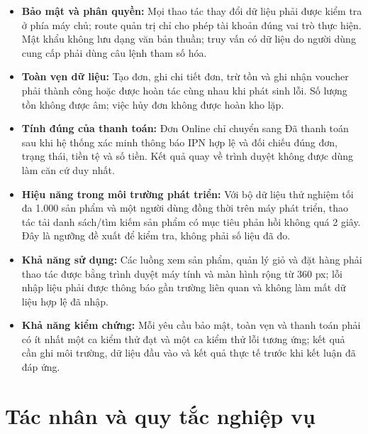 \begin{itemize}
    \item \textbf{Bảo mật và phân quyền:} Mọi thao tác thay đổi dữ liệu phải được kiểm tra ở phía máy chủ; route quản trị chỉ cho phép tài khoản đúng vai trò thực hiện. Mật khẩu không lưu dạng văn bản thuần; truy vấn có dữ liệu do người dùng cung cấp phải dùng câu lệnh tham số hóa.
    \item \textbf{Toàn vẹn dữ liệu:} Tạo đơn, ghi chi tiết đơn, trừ tồn và ghi nhận voucher phải thành công hoặc được hoàn tác cùng nhau khi phát sinh lỗi. Số lượng tồn không được âm; việc hủy đơn không được hoàn kho lặp.
    \item \textbf{Tính đúng của thanh toán:} Đơn Online chỉ chuyển sang Đã thanh toán sau khi hệ thống xác minh thông báo IPN hợp lệ và đối chiếu đúng đơn, trạng thái, tiền tệ và số tiền. Kết quả quay về trình duyệt không được dùng làm căn cứ duy nhất.
    \item \textbf{Hiệu năng trong môi trường phát triển:} Với bộ dữ liệu thử nghiệm tối đa 1.000 sản phẩm và một người dùng đồng thời trên máy phát triển, thao tác tải danh sách/tìm kiếm sản phẩm có mục tiêu phản hồi không quá 2 giây. Đây là ngưỡng đề xuất để kiểm tra, không phải số liệu đã đo.
    \item \textbf{Khả năng sử dụng:} Các luồng xem sản phẩm, quản lý giỏ và đặt hàng phải thao tác được bằng trình duyệt máy tính và màn hình rộng từ 360 px; lỗi nhập liệu phải được thông báo gần trường liên quan và không làm mất dữ liệu hợp lệ đã nhập.
    \item \textbf{Khả năng kiểm chứng:} Mỗi yêu cầu bảo mật, toàn vẹn và thanh toán phải có ít nhất một ca kiểm thử đạt và một ca kiểm thử lỗi tương ứng; kết quả cần ghi môi trường, dữ liệu đầu vào và kết quả thực tế trước khi kết luận đã đáp ứng.
\end{itemize}

\section{Tác nhân và quy tắc nghiệp vụ}
